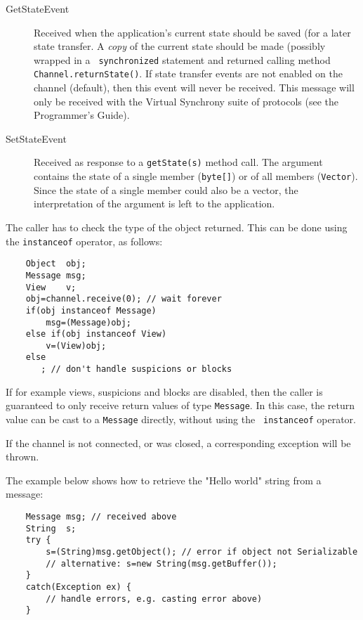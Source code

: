 \begin{description}
    \item[GetStateEvent] Received when the application's current state should be
                         saved (for a later state transfer. A {\em copy} of the
                         current state should be made (possibly wrapped in a {\tt
                         synchronized} statement and returned calling method {\tt
                         Channel.returnState()}. If state transfer events are not
                         enabled on the channel (default), then this event will never
                         be received. This message will only be received with the
                         Virtual Synchrony suite of protocols (see the Programmer's
                         Guide).

    \item[SetStateEvent] Received as response to a {\tt getState(s)} method
	                 call. The argument contains the state of a single member
			 ({\tt byte[]}) or of all members ({\tt Vector}). Since
			 the state of a single member could also be a vector,
			 the interpretation of the argument is left to the
			 application.

    \end{description}

    The caller has to check the type of the object returned. This can be done using
    the {\tt instanceof} operator, as follows:


    \begin{small}
    \begin{verbatim}
    Object  obj;
    Message msg;
    View    v;
    obj=channel.receive(0); // wait forever
    if(obj instanceof Message)
        msg=(Message)obj;
    else if(obj instanceof View)
        v=(View)obj;
    else
       ; // don't handle suspicions or blocks
    \end{verbatim}
    \end{small}

    If for example views, suspicions and blocks are disabled, then the caller is
    guaranteed to only receive return values of type {\tt Message}. In this case,
    the return value can be cast to a {\tt Message} directly, without using the {\tt
    instanceof} operator.

    If the channel is not connected, or was closed, a corresponding exception
    will be thrown.

    The example below shows how to retrieve the "Hello world" string from a message:
    
    \begin{small}
    \begin{verbatim}
    Message msg; // received above
    String  s;
    try {
        s=(String)msg.getObject(); // error if object not Serializable
        // alternative: s=new String(msg.getBuffer());
    }
    catch(Exception ex) {
        // handle errors, e.g. casting error above)
    }
    \end{verbatim}
    \end{small}
	
